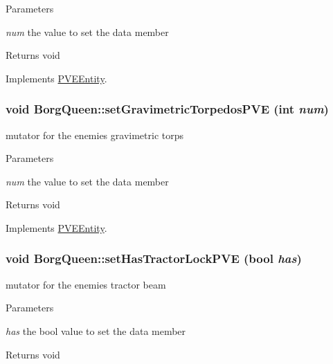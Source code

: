 \begin{DoxyParams}{Parameters}
\item[{\em num}]the value to set the data member\end{DoxyParams}
\begin{DoxyReturn}{Returns}
void 
\end{DoxyReturn}


Implements \hyperlink{classPVEEntity}{PVEEntity}.

\hypertarget{classBorgQueen_aff5f63cf6299acc846a40d6653dad809}{
\subsubsection[{setGravimetricTorpedosPVE}]{\setlength{\rightskip}{0pt plus 5cm}void BorgQueen::setGravimetricTorpedosPVE (int {\em num})}}
\label{d6/d8d/classBorgQueen_aff5f63cf6299acc846a40d6653dad809}
mutator for the enemies gravimetric torps


\begin{DoxyParams}{Parameters}
\item[{\em num}]the value to set the data member\end{DoxyParams}
\begin{DoxyReturn}{Returns}
void 
\end{DoxyReturn}


Implements \hyperlink{classPVEEntity}{PVEEntity}.

\hypertarget{classBorgQueen_af00311c06f2c000c32dc8f6837bfe945}{
\subsubsection[{setHasTractorLockPVE}]{\setlength{\rightskip}{0pt plus 5cm}void BorgQueen::setHasTractorLockPVE (bool {\em has})}}
\label{d6/d8d/classBorgQueen_af00311c06f2c000c32dc8f6837bfe945}
mutator for the enemies tractor beam


\begin{DoxyParams}{Parameters}
\item[{\em has}]the bool value to set the data member\end{DoxyParams}
\begin{DoxyReturn}{Returns}
void 
\end{DoxyReturn}


